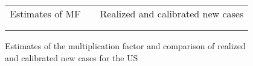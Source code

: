 \documentclass[12pt]{article}
\begin{document}
\begin{figure}[tbh]%
\caption
{Estimates of the multiplication factor and comparison of realized and calibrated new cases for the US}%
\vspace{-0.2cm}%
\label{fig: US_MF}%

\begin{footnotesize}%


\begin{center}%
\begin{tabular}
[c]{ccc}%
Estimates of MF &  & Realized and calibrated new cases\\
&  & \\%
{\includegraphics[
height=1.9951in,
width=2.6524in
]%
{figs/US_ER_N50000_guess5_2W_MF.png}%
}
&  &
{\includegraphics[
height=1.8273in,
width=2.2779in
]%
{figs/US_ER_N50000_guess5_2W_dcT.png}%
}
\end{tabular}




\end{center}
\end{footnotesize}
\end{figure}
\end{document}
